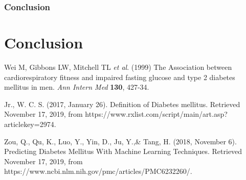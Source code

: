 \documentclass[12pt]{article}
\begin{document}


\section{Conclusion}

\newpage

\part{Conclusion}

\clearpage

\newpage

\begin{thebibliography}{}

Wei M, Gibbons LW, Mitchell TL \textit{et al}. (1999) The Association between cardiorespiratory fitness and impaired fasting glucose and type 2 diabetes mellitus in men. \textit{Ann Intern Med} \textbf{130}, 427-34.

Jr., W. C. S. (2017, January 26). Definition of Diabetes mellitus. Retrieved November 17, 2019, from https://www.rxlist.com/script/main/art.asp?articlekey=2974.

Zou, Q., Qu, K., Luo, Y., Yin, D., Ju, Y.,\& Tang, H. (2018, November 6). Predicting Diabetes Mellitus With Machine Learning Techniques. Retrieved November 17, 2019, from https://www.ncbi.nlm.nih.gov/pmc/articles/PMC6232260/.

\end{thebibliography}
\end{document}
